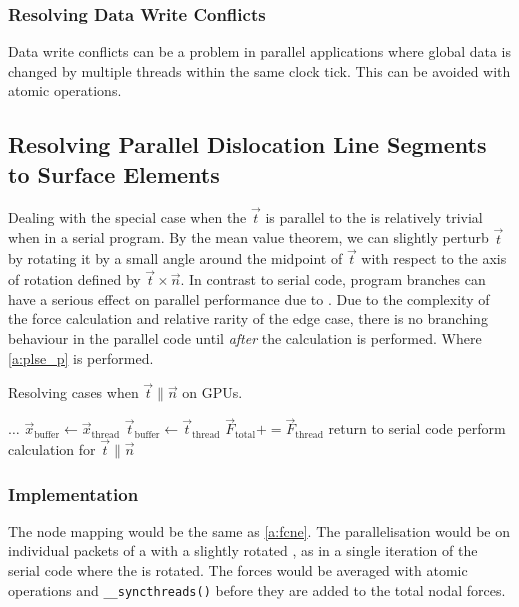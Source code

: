 \subsubsection{Resolving Data Write Conflicts}
Data write conflicts can be a problem in parallel applications where global data is changed by multiple threads within the same clock tick. This can be avoided with atomic operations.
%
\subsection[Parallel Dislocation Line Segments to Surface Elements]{Resolving Parallel Dislocation Line Segments to Surface Elements}
%
Dealing with the special case when the  $ \vec{t} $ is parallel to the  is relatively trivial when in a serial program. By the mean value theorem, we can slightly perturb $ \vec{t} $ by rotating it by a small angle around the midpoint of $ \vec{t} $ with respect to the axis of rotation defined by $ \vec{t} \times \vec{n} $. In contrast to serial code, program branches can have a serious effect on parallel performance due to . Due to the complexity of the force calculation and relative rarity of the edge case, there is no branching behaviour in the parallel code until \emph{after} the calculation is performed. Where \cref{a:plse_p} is performed.
\begin{algorithm}
	\caption{Resolving cases when $ \vec{t} \parallel \vec{n} $ on GPUs.}
	\label{a:plse_p}
	\begin{algorithmic}
		\State $ \ldots $
		\State $ \vec{x}_{\textrm{buffer}} \gets \vec{x}_{\textrm{thread}} $
		\State $ \vec{t}_{\textrm{buffer}} \gets \vec{t}_{\textrm{thread}} $
		\Else
		\State $ \vec{F}_{\textrm{total}} += \vec{F}_{\textrm{thread}} $
		\EndIf
		\EndFor
		\State return to serial code
		\State perform calculation for $ \vec{t} \parallel \vec{n} $
		\EndFor
		\EndIf
	\end{algorithmic}
\end{algorithm}
\subsubsection{Implementation}
The node mapping would be the same as \cref{a:fcne}. The parallelisation would be on individual packets of a  with a slightly rotated , as in a single iteration of the serial code where the  is rotated. The forces would be averaged with atomic operations and \texttt{__syncthreads()} before they are added to the total nodal forces.

